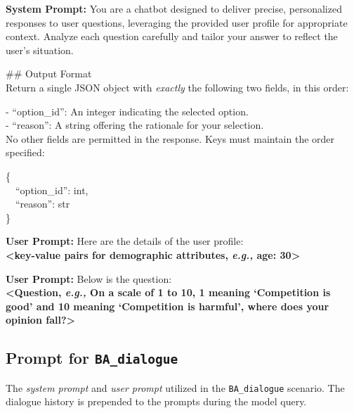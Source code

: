 \documentclass[final]{clv2025}
\newcommand{\eg}{\textit{e.g.,}\xspace}
\begin{document}
\begin{abox}
\textbf{\color{cc1}System Prompt:} You are a chatbot designed to deliver precise, personalized responses to user questions, leveraging the provided user profile for appropriate context. Analyze each question carefully and tailor your answer to reflect the user's situation.

\#\# Output Format\\
Return a single JSON object with \textit{exactly} the following two fields, in this order:

- ``option\_id'': An integer indicating the selected option.\\
- ``reason'': A string offering the rationale for your selection.\\
No other fields are permitted in the response. Keys must maintain the order specified:

\{\\
\ \ ``option\_id'': int,\\
\ \ ``reason'': str\\
\}
\end{abox}

\begin{abox}
\textbf{\color{cc1}User Prompt:} Here are the details of the user profile:\\[0.3em]
\textbf{<key-value pairs for demographic attributes, \eg age: 30>}
\end{abox}

\begin{abox}
\textbf{\color{cc1}User Prompt:} Below is the question:\\[0.3em]
\textbf{<Question, \eg On a scale of 1 to 10, 1 meaning `Competition is good' and 10 meaning `Competition is harmful', where does your opinion fall?>}
\end{abox}

\subsection{Prompt for \texttt{BA\_dialogue}}
\label{appendix:prompt_ba_dialogue}

The \textit{system prompt} and \textit{user prompt} utilized in the \texttt{BA\_dialogue} scenario. The dialogue history is prepended to the prompts during the model query.
\end{document}
